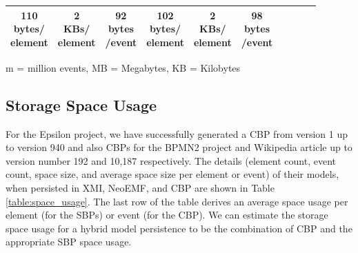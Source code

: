 \documentclass{llncs}
\begin{document}
\begin{table}[ht]
\begin{footnotesize}
\begin{tabular}{| c | c  c  c | c  c  c | c c c |}
            \makecell{110\\bytes/\\element} & \makecell{2\\KBs/\\element}  & \makecell{92\\bytes\\/event} &  
            \makecell{102\\bytes/\\element} & \makecell{2\\KBs/\\element} & \makecell{98\\bytes\\/event}  \\
            \hline 
        \end{tabular}
        \justify
        m = million events, MB = Megabytes, KB = Kilobytes
    \end{footnotesize}
\end{table}

\vspace{-25pt}
\subsection{Storage Space Usage}
\label{sec:storage_space_usage}

\vspace{-5pt}
For the Epsilon project, we have successfully generated a CBP from version 1 up to version 940 and also CBPs for the BPMN2 project and Wikipedia article up to version number 192 and 10,187 respectively. The details (element count, event count, space size, and average space size per element or event) of their models, when persisted in XMI, NeoEMF, and CBP are shown in Table \ref{table:space_usage}. The last row of the table derives an average space usage per element (for the SBPs) or event (for the CBP). We can estimate the storage space usage for a hybrid model persistence to be the combination of CBP and the appropriate SBP space usage.
\end{document}
